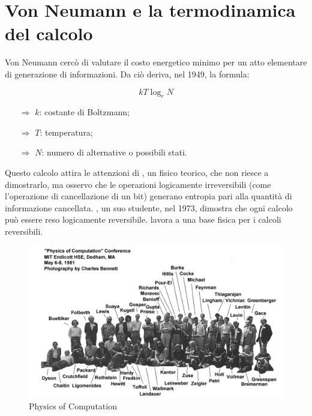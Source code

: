 \section{Von Neumann e la termodinamica del calcolo}

Von Neumann cercò di valutare il costo energetico minimo per un
atto elementare di generazione di informazioni. Da ciò deriva, nel 1949,
la formula:

$$kT \log_e N$$

\begin{itemize}
    \item [$\Rightarrow$] $k$: costante di Boltzmann;
    \item [$\Rightarrow$] $T$: temperatura;
    \item [$\Rightarrow$] $N$: numero di alternative o possibili stati.
\end{itemize}

Questo calcolo attira le attenzioni di , un fisico teorico, 
che non riesce a dimostrarlo, ma osservo che le operazioni logicamente
irreversibili (come l'operazione di cancellazione di un bit) generano entropia
pari alla quantità di informazione cancellata. , un suo studente,
nel 1973, dimostra che ogni calcolo può essere reso logicamente reversibile.
 lavora a una base fisica per i calcoli reversibili.


\begin{figure}[h]
    \centering
    \includegraphics[scale=0.3]{images/Comp.png}
    \caption{Physics of Computation}
\end{figure}


